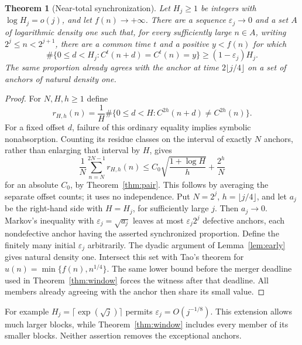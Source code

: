 \documentclass[11pt]{amsart}
\newtheorem{theorem}{Theorem}[section]
\theoremstyle{definition}
\theoremstyle{remark}
\begin{document}
\begin{theorem}[Near-total synchronization]
Let $H_j\ge1$ be integers with $\log H_j=o(j)$, and let $f(n)\to+\infty$. There are a sequence $\varepsilon_j\to0$ and a set $A$ of logarithmic density one such that, for every sufficiently large $n\in A$, writing $2^j\le n<2^{j+1}$, there are a common time $t$ and a positive $y<f(n)$ for which
\[
 \#\{0\le d<H_j:C^t(n+d)=C^t(n)=y\}
 \ge(1-\varepsilon_j)H_j.
\]
The same proportion already agrees with the anchor at time $2\lfloor j/4\rfloor$ on a set of anchors of natural density one.
\end{theorem}
\begin{proof}
For $N,H,h\ge1$ define
\[
 r_{H,h}(n)=\frac1H\#\{0\le d<H:C^{2h}(n+d)\ne C^{2h}(n)\}.
\]
For a fixed offset $d$, failure of this ordinary equality implies symbolic nonabsorption. Counting its residue classes on the interval of exactly $N$ anchors, rather than enlarging that interval by $H$, gives
\[
 \frac1N\sum_{n=N}^{2N-1}r_{H,h}(n)
 \le C_0\sqrt{\frac{1+\log H}{h}}+\frac{2^h}{N}
\]
for an absolute $C_0$, by Theorem~\ref{thm:pair}. This follows by averaging the separate offset counts; it uses no independence.
Put $N=2^j$, $h=\lfloor j/4\rfloor$, and let $a_j$ be the right-hand side with $H=H_j$, for sufficiently large $j$. Then $a_j\to0$. Markov's inequality with $\varepsilon_j=\sqrt{a_j}$ leaves at most $\varepsilon_j2^j$ defective anchors, each nondefective anchor having the asserted synchronized proportion. Define the finitely many initial $\varepsilon_j$ arbitrarily. The dyadic argument of Lemma~\ref{lem:early} gives natural density one.
Intersect this set with Tao's theorem for $u(n)=\min\{f(n),n^{1/4}\}$. The same lower bound before the merger deadline used in Theorem~\ref{thm:window} forces the witness after that deadline. All members already agreeing with the anchor then share its small value.
\end{proof}
For example $H_j=\lceil\exp(\sqrt j)\rceil$ permits $\varepsilon_j=O(j^{-1/8})$. This extension allows much larger blocks, while Theorem~\ref{thm:window} includes every member of its smaller blocks. Neither assertion removes the exceptional anchors.
\end{document}
